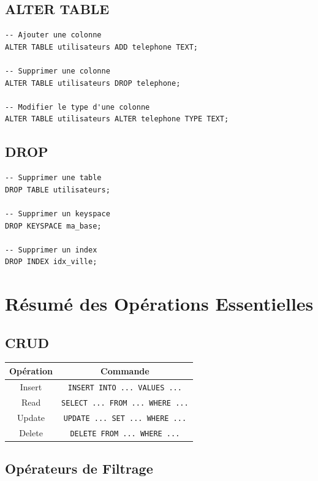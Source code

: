 \documentclass[11pt,a4paper]{article}
\begin{document}
\subsection{ALTER TABLE}

\begin{lstlisting}
-- Ajouter une colonne
ALTER TABLE utilisateurs ADD telephone TEXT;

-- Supprimer une colonne
ALTER TABLE utilisateurs DROP telephone;

-- Modifier le type d'une colonne
ALTER TABLE utilisateurs ALTER telephone TYPE TEXT;
\end{lstlisting}

\subsection{DROP}

\begin{lstlisting}
-- Supprimer une table
DROP TABLE utilisateurs;

-- Supprimer un keyspace
DROP KEYSPACE ma_base;

-- Supprimer un index
DROP INDEX idx_ville;
\end{lstlisting}

\newpage

\section{Résumé des Opérations Essentielles}

\subsection{CRUD}

\begin{table}[h]
\centering
\begin{tabular}{|c|c|}
\hline
\textbf{Opération} & \textbf{Commande} \\
\hline
Insert & \texttt{INSERT INTO ... VALUES ...} \\
\hline
Read & \texttt{SELECT ... FROM ... WHERE ...} \\
\hline
Update & \texttt{UPDATE ... SET ... WHERE ...} \\
\hline
Delete & \texttt{DELETE FROM ... WHERE ...} \\
\hline
\end{tabular}
\end{table}

\subsection{Opérateurs de Filtrage}
\end{document}
